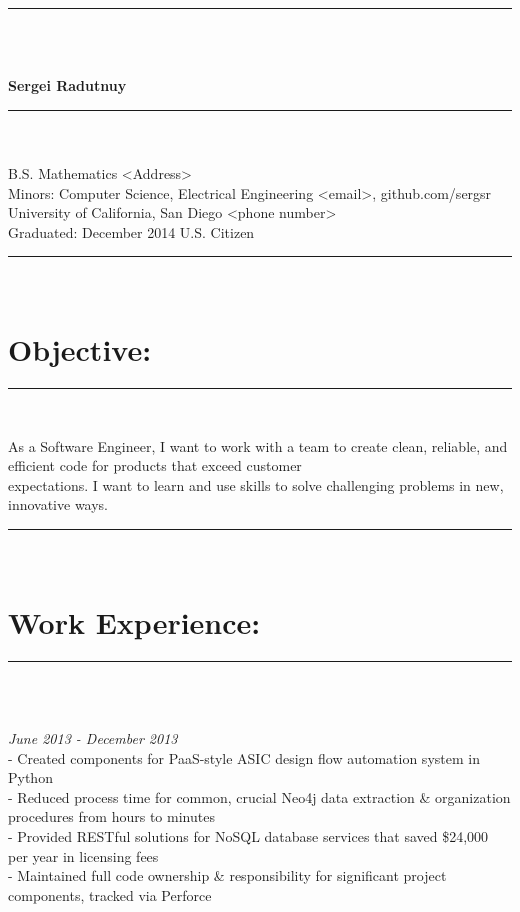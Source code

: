 \documentclass{article}
\newcommand{\sline}{\noindent\rule{575pt}{0.5pt}}
\begin{document}
\sline \\\\
\centerline{\textbf{{\Large Sergei Radutnuy}}}
\sline \\\\
	\indent B.S. Mathematics
  \hfill <Address>\\
	\indent Minors: Computer Science, Electrical Engineering
  \hspace{256.5pt} <email>, github.com/sergsr \\
	\indent University of California, San Diego
  \hspace{220pt} <phone number>\\
	\indent Graduated: December 2014
  \hspace{217.5pt} U.S. Citizen   \\

\sline \\
\section*{Objective:}
\sline \\
\begin{spacing}{1.0}
  \indent As a Software Engineer, I want to work with a team to create clean,
          reliable, and efficient code for products that exceed customer \\
  \indent expectations. I want to learn and use skills to solve challenging
          problems in new, innovative ways.
\end{spacing}

\sline \\
\section*{Work Experience:}
\sline \\

\begin{spacing}{1.0}
    \\
  \hfill {\sl June 2013 - December 2013} \\
  \indent \indent - Created components for PaaS-style ASIC design flow
                    automation system in Python\\
  \indent \indent - Reduced process time for common, crucial Neo4j data
                    extraction \& organization procedures from hours to minutes
                    \\
  \indent \indent - Provided RESTful solutions for NoSQL database services that
                    saved \$24,000 per year in licensing fees \\
  \indent \indent - Maintained full code ownership \& responsibility for
                    significant project components, tracked via Perforce
\end{spacing}
\end{document}
